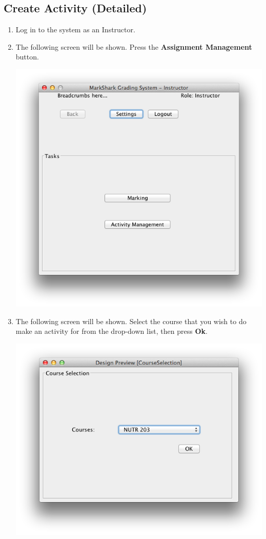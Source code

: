 \documentclass{article}
\begin{document}
\subsection{Create Activity (Detailed)}
\begin{enumerate}
  \item Log in to the system as an Instructor.
  \item The following screen will be shown.
    Press the \textbf{Assignment Management} button.
  \begin{center} 
   \includegraphics[scale=0.55]{../images/UpdatedUIScreens/landinginstructor.png}
  \end{center}
  \item The following screen will be shown.  Select the course that you wish
    to do make an activity for from the drop-down list, then press \textbf{Ok}.
    \begin{center} 
      \includegraphics[scale=0.55]{../images/UpdatedUIScreens/CourseSelection.png}

\end{center}
\end{enumerate}
\end{document}
